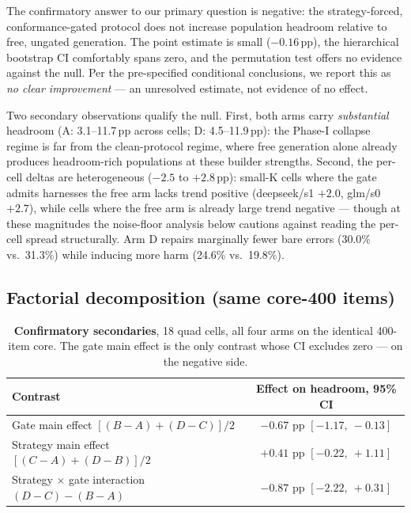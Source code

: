 The confirmatory answer to our primary question is negative: the strategy-forced,
conformance-gated protocol does not increase population headroom relative to free,
ungated generation. The point estimate is small ($-0.16$\,pp), the hierarchical
bootstrap CI comfortably spans zero, and the permutation test offers no evidence
against the null. Per the pre-specified conditional conclusions, we report this as
\emph{no clear improvement} --- an unresolved estimate, not evidence of no effect.

Two secondary observations qualify the null. First, both arms carry \emph{substantial}
headroom (A: 3.1--11.7\,pp across cells; D: 4.5--11.9\,pp): the Phase-I collapse
regime is far from the clean-protocol regime, where free generation alone already
produces headroom-rich populations at these builder strengths. Second, the per-cell
deltas are heterogeneous ($-2.5$ to $+2.8$\,pp): small-K cells where the gate admits
harnesses the free arm lacks trend positive (deepseek/s1 $+2.0$, glm/s0 $+2.7$),
while cells where the free arm is already large trend negative --- though at these
magnitudes the noise-floor analysis below cautions against reading the per-cell
spread structurally. Arm D repairs marginally fewer bare errors (30.0\% vs.\ 31.3\%)
while inducing more harm (24.6\% vs.\ 19.8\%).

\subsection{Factorial decomposition (same core-400 items)}\label{sec:results-factorial}

\begin{table}[t]
\centering
\small
\begin{tabular}{@{}lc@{}}
\toprule
Contrast & Effect on headroom, 95\% CI \\
\midrule
Gate main effect $[(B{-}A)+(D{-}C)]/2$ & $\mathbf{-0.67}$ pp $\mathbf{[-1.17,\ -0.13]}$ \\
Strategy main effect $[(C{-}A)+(D{-}B)]/2$ & $+0.41$ pp $[-0.22,\ +1.11]$ \\
Strategy $\times$ gate interaction $(D{-}C)-(B{-}A)$ & $-0.87$ pp $[-2.22,\ +0.31]$ \\
\bottomrule
\end{tabular}
\caption{\textbf{Confirmatory secondaries}, 18 quad cells, all four arms on the
identical 400-item core. The gate main effect is the only contrast whose CI excludes
zero --- on the negative side.}
\label{tab:factorial}
\end{table}

